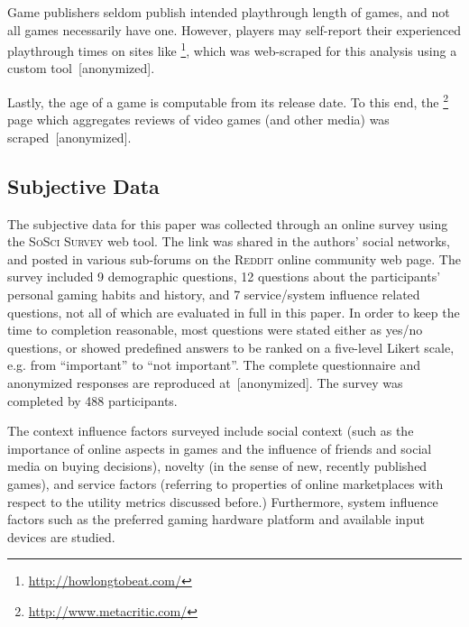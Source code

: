Game publishers seldom publish intended playthrough
length of games, and not all games necessarily have one. However, players
may self-report their experienced playthrough times on sites like
\hltb\footnote{\url{http://howlongtobeat.com/}}, which was web-scraped
for this analysis using a custom tool~[anonymized].


Lastly, the age of a game is computable from its release date. To this end, the
\metacritic\footnote{\url{http://www.metacritic.com/}} page which
aggregates reviews of video games (and other media) was
scraped~[anonymized].



\subsection{Subjective Data}

The subjective data for this paper was collected through an online
survey using the \textsc{SoSci Survey} web tool. The link was shared
in the authors' social networks, and posted in various sub-forums on
the \textsc{Reddit} online community web page.
The survey included 9 demographic questions, 12 questions about the
participants' personal gaming habits and history, and 7 service/system
influence related questions, not all of which are evaluated in full
in this paper.
In order to keep the time to completion reasonable, most questions
were stated either as yes/no questions, or showed predefined answers
to be ranked on a five-level Likert scale, e.g. from ``important'' to
``not important''.
The complete questionnaire and anonymized responses
are reproduced at~[anonymized].
The survey was completed by
488 participants.

The context influence factors surveyed include social context (such
as the importance of online aspects in games and the influence of
friends and social media on buying decisions), novelty (in the sense
of new, recently published games), and service factors (referring to
properties of online marketplaces with respect to the utility metrics
discussed before.) Furthermore, system influence factors such as
the preferred gaming hardware platform and available input devices
are studied.
